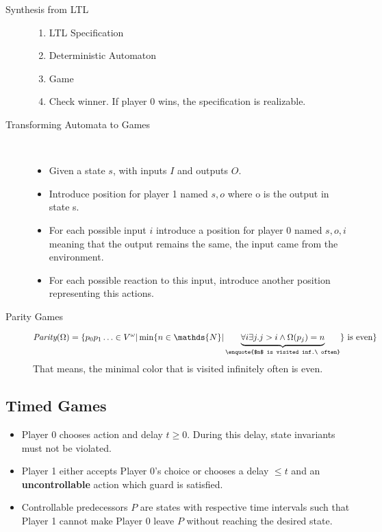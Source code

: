 \begin{description}
	\item[Synthesis from LTL] 
	\begin{enumerate}
		\item LTL Specification
		\item Deterministic Automaton
		\item Game
		\item Check winner. If player 0 wins, the specification is realizable.
	\end{enumerate}
	\item[Transforming Automata to Games] \ 
	\begin{itemize}
		\item Given a state $s$, with inputs $I$ and outputs $O$. 
		\item Introduce position for player 1 named $s, o$ where o is the output in state s. 
		\item For each possible input $i$ introduce a position for player 0 named $s, o, i$ meaning that the output remains the same, the input came from the environment. 
		\item For each possible reaction to this input, introduce another position representing this actions.
	\end{itemize}
	\item[Parity Games] 
	\[ \textit{Parity}(\Omega) = \{ p_0p_1\ldots \in V^\omega | \min\{ n \in \mathds{N} | \underbrace{\forall i \exists j. j>i \land \Omega(p_j) = n}_\text{\enquote{$n$ is visited inf.\ often}} \} \text{ is even} \} \] 
	That means, the minimal color that is visited infinitely often is even.
\end{description}

\subsection{Timed Games}

\begin{itemize}
	\item Player 0 chooses action and delay $t \geq 0$. During this delay, state invariants must not be violated.
	\item Player 1 either accepts Player 0's choice or chooses a delay $\leq t$ and an \textbf{uncontrollable} action which guard is satisfied.
	\item Controllable predecessors $P$ are states with respective time intervals such that Player 1 cannot make Player 0 leave $P$ without reaching the desired state.
\end{itemize}

